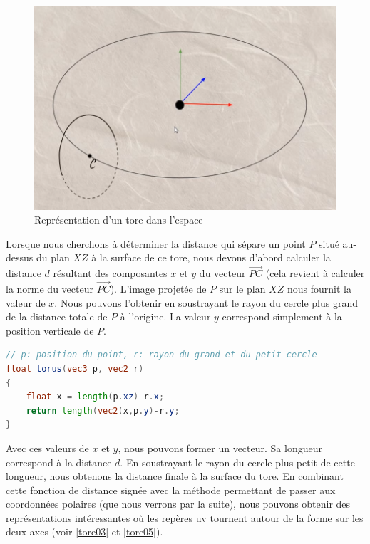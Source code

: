 \begin{figure}[h]
    \centering
    \includegraphics[width=0.5\linewidth]{images//sdf/tore01.png}
    \caption{Représentation d'un tore dans l'espace}
    \label{tore01}
\end{figure}

Lorsque nous cherchons à déterminer la distance qui sépare un point $P$ situé au-dessus du plan $XZ$ à la surface de ce tore, nous devons d'abord calculer la distance $d$ résultant des composantes $x$ et $y$ du vecteur $\vec{PC}$ (cela revient à calculer la norme du vecteur $\vec{PC}$). L'image projetée de $P$ sur le plan $XZ$ nous fournit la valeur de $x$. Nous pouvons l'obtenir en soustrayant le rayon du cercle plus grand de la distance totale de $P$ à l'origine. La valeur $y$ correspond simplement à la position verticale de $P$.


\begin{minipage}{\linewidth}
\begin{lstlisting}[language=GLSL, caption=SDF d'un tore,captionpos=b,frame=single]
// p: position du point, r: rayon du grand et du petit cercle
float torus(vec3 p, vec2 r)
{
    float x = length(p.xz)-r.x;
    return length(vec2(x,p.y)-r.y;
}
\end{lstlisting}
\end{minipage}

Avec ces valeurs de $x$ et $y$, nous pouvons former un vecteur. Sa longueur correspond à la distance $d$. En soustrayant le rayon du cercle plus petit de cette longueur, nous obtenons la distance finale à la surface du tore. En combinant cette fonction de distance signée avec la méthode permettant de passer aux coordonnées polaires (que nous verrons par la suite), nous pouvons obtenir des représentations intéressantes où les repères uv tournent autour de la forme sur les deux axes (voir \ref{tore03} et \ref{tore05}).


